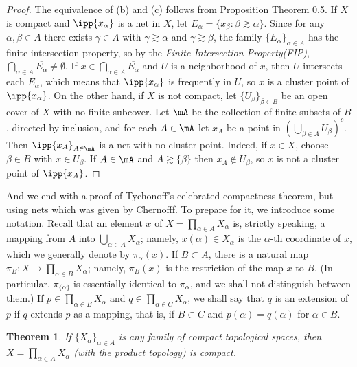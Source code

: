 \documentclass[12pt,english]{article}
\newtheorem{theorem}{Theorem}[section]
\begin{document}
\begin{proof}
    The equivalence of (b) and (c) follows from Proposition Theorem 0.5. If $X$ is compact and $\ipp{x_\alpha}$ is a net in $X$, let $E_\alpha = \{x_\beta : \beta \gtrsim \alpha\}$. 
    Since for any $\alpha, \beta \in A$ there exists $\gamma \in A$ with $\gamma \gtrsim \alpha$ and $\gamma \gtrsim \beta$, the family $\{E_\alpha\}_{\alpha \in A}$ has the finite intersection property, so by the \textit{Finite Intersection Property(FIP)}, $\bigcap_{\alpha \in A} \overline{E_\alpha} \neq \emptyset$. 
    If $x \in \bigcap_{\alpha \in A} \overline{E_\alpha}$ and $U$ is a neighborhood of $x$, then $U$ intersects each $E_\alpha$, which means that $\ipp{x_\alpha}$ is frequently in $U$, so $x$ is a cluster point of $\ipp{x_\alpha}$. 
    On the other hand, if $X$ is not compact, let $\{U_\beta\}_{\beta \in B}$ be an open cover of $X$ with no finite subcover. 
    Let $\mA$ be the collection of finite subsets of $B$, directed by inclusion, and for each $A \in \mA$ let $x_A$ be a point in $(\bigcup_{\beta \in A} U_\beta)^c$. 
    Then $\ipp{x_A}_{A \in \mA}$ is a net with no cluster point. 
    Indeed, if $x \in X$, choose $\beta \in B$ with $x \in U_\beta$. If $A \in \mA$ and $A \gtrsim \{\beta\}$ then $x_A \notin U_\beta$, so $x$ is not a cluster point of $\ipp{x_A}$.
\end{proof}
And we end with a proof of Tychonoff's celebrated compactness theorem, but using nets which was given by Chernofff.
To prepare for it, we introduce some notation. Recall that an element $x$ of $X = \prod_{\alpha \in A} X_\alpha$ is, strictly speaking, a mapping from $A$ into $\bigcup_{\alpha \in A} X_\alpha$; namely, $x(\alpha) \in X_\alpha$ is the $\alpha$-th coordinate of $x$, which we generally denote by $\pi_\alpha(x)$. If $B \subset A$, there is a natural map $\pi_B : X \to \prod_{\alpha \in B} X_\alpha$; namely, $\pi_B(x)$ is the restriction of the map $x$ to $B$. (In particular, $\pi_{\{\alpha\}}$ is essentially identical to $\pi_\alpha$, and we shall not distinguish between them.) 
If $p \in \prod_{\alpha \in B} X_\alpha$ and $q \in \prod_{\alpha \in C} X_\alpha$, we shall say that $q$ is an extension of $p$ if $q$ extends $p$ as a mapping, that is, if $B \subset C$ and $p(\alpha) = q(\alpha)$ for $\alpha \in B$.
\begin{theorem}
If $\{X_\alpha\}_{\alpha \in A}$ is any family of compact topological spaces, then $X = \prod_{\alpha \in A} X_\alpha$ (with the product topology) is compact.
\end{theorem}
\end{document}
